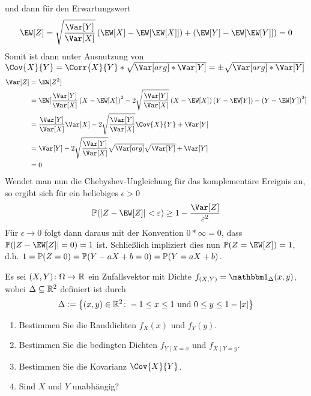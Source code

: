 \begin{exercisePage}
\begin{enumerate}[label = (zu \alph*), leftmargin=*]
\begin{proof-equivalence}
			und dann für den Erwartungswert
			\begin{equation*}
				\EW[Z] = \wurzel \left( {\EW[X]} - \EW[{\EW[X]}] \right) + \left( \EW[Y] - \EW[{\EW[Y]}] \right) = 0
			\end{equation*}
			Somit ist dann unter Ausnutzung von $\Cov{X}{Y} = \Corr{X}{Y} * \sqrt{\Var[arg] * \Var[Y]} = \pm \sqrt{\Var[arg] * \Var[Y]}$
			\begin{equation*}
			\begin{aligned}
				\Var[Z] 
				&= \EW[Z^2] \\
				&= \EW[\bruch \left(X - {\EW[X]} \right)^2 - 2 \wurzel \left( X - {\EW[X]} \right) \left( Y - {\EW[Y]} \right) - \left( Y - {\EW[Y]} \right)^2] \\
				&= \bruch \Var[X] - 2 \wurzel \Cov{X}{Y} + \Var[Y] \\
				&= \Var[Y] - 2 \wurzel \sqrt{\Var[arg]} \sqrt{\Var[Y]} + \Var[Y] \\
				&= 0			
			\end{aligned}
			\end{equation*}
			Wendet man nun die Chebyshev-Ungleichung für das komplementäre Ereignis an, so ergibt sich für ein beliebiges $\epsilon > 0$
			\begin{equation*}
				\P( \abs{Z - \EW[Z]} < \epsilon) \geq 1 - \frac{\Var[Z]}{\epsilon^2}
			\end{equation*}
			Für $\epsilon \to 0$ folgt dann daraus mit der Konvention $0 * \infty = 0$, dass $\P(\abs{Z - \EW[Z]} = 0) = 1$ ist. Schließlich impliziert dies nun $\P(Z = \EW[Z]) = 1$, d.h. $1 = \P(Z = 0) = \P(Y - aX+b = 0) = \P(Y = aX+b)$.
		\end{proof-equivalence}
	\end{enumerate}

	\undef\wurzel
	\undef\bruch
	
	
	\begin{homework}
		Es sei $\abb{(X,Y)}{\Omega}{\R}$ ein Zufallsvektor mit Dichte $f_{(X,Y)} = \one_\Delta(x,y)$, wobei $\Delta \subseteq \R^2$ definiert ist durch
		\begin{equation*}
			\Delta \defeq \menge{(x,y) \in \R^2 \colon -1 \le x \le 1 \text{ und }0 \le y \le 1-\abs{x}}
		\end{equation*}
		\begin{enumerate}[leftmargin=*, nolistsep]
			\item Bestimmen Sie die Randdichten $f_X(x)$ und $f_Y(y)$.
			\item Bestimmen Sie die bedingten Dichten $f_{Y \mid X=x}$ und $f_{X \mid Y=y}$.
			\item Bestimmen Sie die Kovarianz $\Cov{X}{Y}$.
			\item Sind $X$ und $Y$ unabhängig?
		\end{enumerate}
	\end{homework}


\end{exercisePage}
